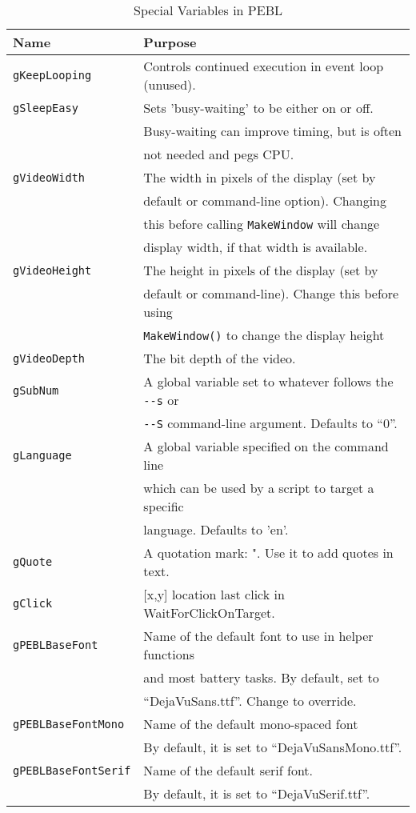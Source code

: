 \begin{table}[htbp]
\caption{Special Variables in PEBL}

\begin{tabular}{ll}
\toprule
\textbf{Name}&\textbf{Purpose}\\
\midrule
\verb+gKeepLooping+ & Controls continued execution in event loop (unused). \\
\addlinespace[.2cm]
\verb+gSleepEasy+      &Sets 'busy-waiting' to be either on or off.\\
                       &Busy-waiting can improve timing, but is often\\
                       &not needed and pegs CPU.   \\
\verb+gVideoWidth+  &	The width in pixels of the display (set by\\
             &  default or command-line option). Changing \\
             &  this before calling \verb+MakeWindow+ will change \\
             &  display width, if that width is available. \\
\addlinespace[.2cm]
\verb+gVideoHeight+ & 	The height in pixels of the display (set by\\
             & 	default or command-line). Change this before using \\
             &  \verb+MakeWindow()+ to change the display height\\

\addlinespace[.2cm]
\verb+gVideoDepth+    &      	The bit depth of the video.\\

\addlinespace[.2cm]
\verb+gSubNum+      &  A global variable set to whatever follows the \verb+--s+ or \\
             & \verb+--S+ command-line argument.  Defaults to ``0''.\\

\verb+gLanguage+   & A global variable specified on the command line\\
&which can be used by a script to target a specific \\
&language.  Defaults to 'en'.\\
\verb+gQuote+ &A quotation mark: ".  Use it to add quotes in text.\\
\verb+gClick+ &[x,y] location last click in WaitForClickOnTarget.\\
\verb+gPEBLBaseFont+& Name of the default font to use in helper functions\\
                    &and most battery tasks. By default, set to \\
                    &``DejaVuSans.ttf''. Change to  override.\\
\verb+gPEBLBaseFontMono+&Name of the default mono-spaced font\\
&  By default, it is set to ``DejaVuSansMono.ttf''. \\
\verb+gPEBLBaseFontSerif+&Name of the default serif font.\\
& By default, it is set to ``DejaVuSerif.ttf''.\\


\end{tabular}
\end{table}
